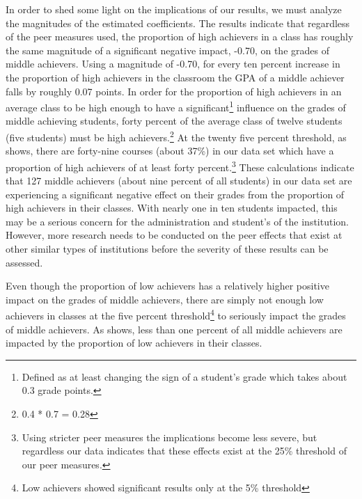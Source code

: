 In order to shed some light on the implications of our results, we must analyze the magnitudes of the estimated coefficients.
The results indicate that regardless of the peer measures used, the proportion of high achievers in a class has roughly the same magnitude of a significant negative impact, -0.70, on the grades of middle achievers. 
Using a magnitude of -0.70, for every ten percent increase in the proportion of high achievers in the classroom the GPA of a middle achiever falls by roughly 0.07 points. 
In order for the proportion of high achievers in an average class to be high enough to have a significant\footnote{Defined as at least changing the sign of a student's grade which takes about 0.3 grade points.} influence on the grades of middle achieving students, forty percent of the average class of twelve students (five students) must be high achievers.\footnote{0.4 * 0.7 = 0.28} 
At the twenty five percent threshold, as  shows, there are forty-nine courses (about 37\%) in our data set which have a proportion of high achievers of at least forty percent.\footnote{Using stricter peer measures the implications become less severe, but regardless our data indicates that these effects exist at the 25\% threshold of our peer measures.}  
These calculations indicate that 127 middle achievers (about nine percent of all students) in our data set are experiencing a significant negative effect on their grades from the proportion of high achievers in their classes. 
With nearly one in ten students impacted, this may be a serious concern for the administration and student's of the institution.
However, more research needs to be conducted on the peer effects that exist at other similar types of institutions before the severity of these results can be assessed.

Even though the proportion of low achievers has a relatively higher positive impact on the grades of middle achievers, there are simply not enough low achievers in classes at the five percent threshold\footnote{Low achievers showed significant results only at the 5\% threshold} to seriously impact the grades of middle achievers.
As  shows, less than one percent of all middle achievers are impacted by the proportion of low achievers in their classes. 

